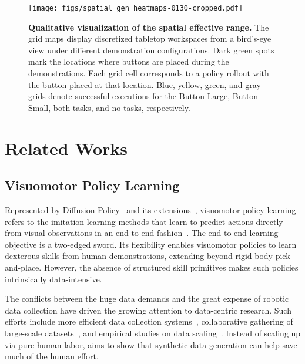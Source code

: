 \begin{figure*}[t]
    \centering
    \texttt{[image: figs/spatial\_gen\_heatmaps-0130-cropped.pdf]}
    \caption{\textbf{Qualitative visualization of the spatial effective range.} The grid maps display discretized tabletop workspaces from a bird's-eye view under different demonstration configurations. Dark green spots mark the locations where buttons are placed during the demonstrations. Each grid cell corresponds to a policy rollout with the button placed at that location. Blue, yellow, green, and gray grids denote successful executions for the Button-Large, Button-Small, both tasks, and no tasks, respectively.}
    \label{fig:spatial_gen_vis}
    \vspace{-0.2cm}
\end{figure*}



\section{Related Works}
\subsection{Visuomotor Policy Learning}
Represented by Diffusion Policy~\cite{chi2023diffusion_policy} and its extensions~\cite{ze20243d,ke20243d,prasad2024consistency,wang2024one,wang2024equivariant}, visuomotor policy learning refers to the imitation learning methods that learn to predict actions directly from visual observations in an end-to-end fashion~\cite{levine2016end}. 
The end-to-end learning objective is a two-edged sword. Its flexibility enables visuomotor policies to learn dexterous skills from human demonstrations, extending beyond rigid-body pick-and-place. However, the absence of structured skill primitives makes such policies intrinsically data-intensive.

The conflicts between the huge data demands and the great expense of robotic data collection have driven the growing attention to data-centric research. Such efforts include more efficient data collection systems~\cite{chi2024universal,cheng2024open,li2024okami}, collaborative gathering of large-scale datasets~\cite{o2024open,khazatsky2024droid}, and empirical studies on data scaling~\cite{zhao2024aloha,lin2024data}. Instead of scaling up via pure human labor, \method aims to show that synthetic data generation can help save much of the human effort.


